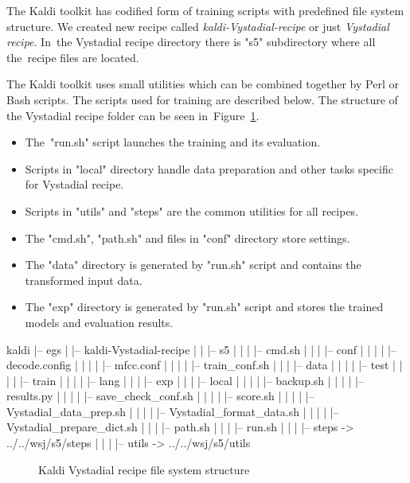 \small{The Kaldi toolkit has codified form of training scripts with predefined file system structure. 
We created new recipe called {\it kaldi-Vystadial-recipe}\/ or just {\it Vystadial recipe}. 
In~the Vystadial recipe directory there is "s5" subdirectory where all the~recipe files are located. 

The Kaldi toolkit uses small utilities which can be combined together by Perl or Bash scripts.
The scripts used for training are described below. 
The structure of the Vystadial recipe folder can be seen in~Figure~\ref{fig:s5_dir}.
\begin{itemize}
    \item The~"run.sh" script launches the training and its evaluation.
    \item Scripts in "local" directory handle data preparation and other tasks specific for Vystadial recipe.
    \item Scripts in "utils" and "steps" are the common utilities for all recipes. 
    \item The "cmd.sh", "path.sh" and files in "conf" directory store settings.
    \item The "data" directory is generated by "run.sh" script and contains the transformed input data.
    \item The "exp" directory is generated by "run.sh" script and stores the trained models and evaluation results.
\end{itemize}

\tiny\begin{verbbox}
kaldi
|-- egs
|   |-- kaldi-Vystadial-recipe
|   |   |-- s5
|   |   |   |-- cmd.sh
|   |   |   |-- conf
|   |   |   |   |-- decode.config
|   |   |   |   |-- mfcc.conf
|   |   |   |   |-- train_conf.sh
|   |   |   |-- data
|   |   |   |   |-- test 
|   |   |   |   |-- train
|   |   |   |   |-- lang
|   |   |   |-- exp
|   |   |   |-- local
|   |   |   |   |-- backup.sh
|   |   |   |   |-- results.py
|   |   |   |   |-- save_check_conf.sh
|   |   |   |   |-- score.sh
|   |   |   |   |-- Vystadial_data_prep.sh
|   |   |   |   |-- Vystadial_format_data.sh
|   |   |   |   |-- Vystadial_prepare_dict.sh
|   |   |   |-- path.sh
|   |   |   |-- run.sh
|   |   |   |-- steps -> ../../wsj/s5/steps
|   |   |   |-- utils -> ../../wsj/s5/utils
\end{verbbox}
\normalsize

\begin{figure}[!htp]
\centering \theverbbox \caption{\small{Kaldi Vystadial recipe file system structure}}
\label{fig:s5_dir}
\end{figure}

}
